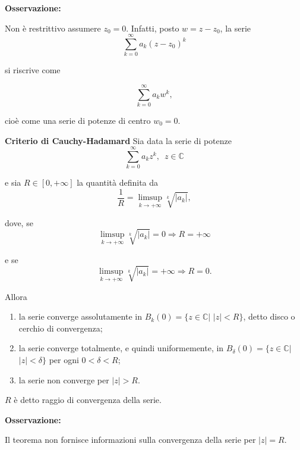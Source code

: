 \begin{attbar}
	\textbf{Osservazione:}
	
	Non è restrittivo assumere $z_0=0$. Infatti, posto $w=z-z_0$, la serie 
	$$\sum_{k=0}^{\infty} a_k(z-z_0)^k$$ 
	
	si riscrive come 
	
	$$\sum_{k=0}^{\infty} a_k w^k,$$
	
	cioè come una serie di potenze di centro $w_0=0$.
\end{attbar}


\begin{theorem} \textbf{Criterio di Cauchy-Hadamard}
	\label{th: pag 285}
	Sia data la serie di potenze
	\begin{equation*}
		\sum_{k=0}^{\infty} a_kz^k,\,\,\, z \in \mathbb{C}
	\end{equation*}
	
	e sia $R\in [0,+\infty]$ la quantità definita da 
	\begin{equation*}
		\frac{1}{R}=\limsup_{k \rightarrow+\infty} \sqrt[k]{|a_k|},
	\end{equation*}
	
	dove, se
	\begin{equation*}
		\limsup_{k \rightarrow+\infty} \sqrt[k]{|a_k|} =0 \Rightarrow R=+\infty
	\end{equation*}
	
	e se
	\begin{equation*}
		\limsup_{k \rightarrow+\infty} \sqrt[k]{|a_k|} =+\infty \Rightarrow R=0.
	\end{equation*}

	Allora
	\begin{enumerate}
		\item la serie converge assolutamente in $B_k(0)=\{z\in\mathbb{C} \big|$ $|z|<R\}$, detto disco o cerchio di convergenza;
		
		\item la serie converge totalmente, e quindi uniformemente, in $B_\delta (0)=\{z \in \mathbb{C} \big|$ $|z|< \delta\}$ per ogni $0< \delta < R$;
		
		\item la serie non converge per $|z|>R$.
	\end{enumerate}
	
	$R$ è detto raggio di convergenza della serie.
\end{theorem}


\begin{attbar}
	\textbf{Osservazione:}
	
	Il teorema non fornisce informazioni sulla convergenza della serie per $|z|=R$.
\end{attbar}


